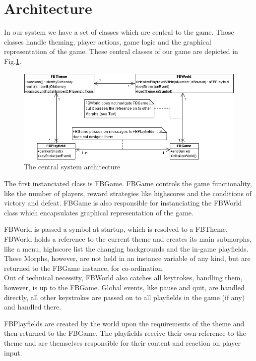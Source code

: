 \section{Architecture}
In our system we have a set of classes which are central to the 
game. Those classes handle theming, player actions, game logic 
and the graphical representation of the game. These central
classes of our game are depicted in Fig.\ref{fig:architecture}.
%
\begin{figure}[bt]
  \begin{center}
    \includegraphics[width=0.9\linewidth]{images/architecture.png}
  \end{center}
  \caption{The central system architecture}
  \label{fig:architecture}
\end{figure}
%
The first instanciated class is FBGame. FBGame controls the game functionality, 
like the number of players, reward strategies like highscores and the
conditions of victory and defeat. FBGame is also responsible for instanciating
the FBWorld class which encapsulates graphical representation of the game.

FBWorld is passed a symbol at startup, which is resolved to a FBTheme. FBWorld 
holds a reference to the current theme and creates its main submorphs, like
a menu, highscore list the changing backgrounds and the in-game playfields.
These Morphs, however, are not held in an instance variable of any kind, but 
are returned to the FBGame instance, for co-ordination.\\
Out of technical necessity, FBWorld also catches all keytrokes, handling them, 
however, is up to the FBGame. Global events, like pause and quit, are handled 
directly, all other keystrokes are passed on to all playfields in the game (if any)
and handled there.

FBPlayfields are created by the world upon the requirements of the theme
and then returned to the FBGame. The playfields receive their own reference 
to the theme and are themselves responsible for their content and reaction on 
player input.

